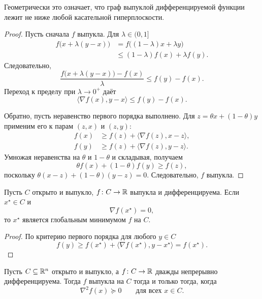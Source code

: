 Геометрически это означает, что граф выпуклой дифференцируемой
функции лежит не ниже любой касательной гиперплоскости.

\begin{proof}
Пусть сначала \(f\) выпукла. Для \(\lambda\in(0,1]\)
\[
\begin{aligned}
    f\bigl(x+\lambda(y-x)\bigr)
    &=
    f\bigl((1-\lambda)x+\lambda y\bigr)
    \\
    &\le
    (1-\lambda)f(x)+\lambda f(y).
\end{aligned}
\]
Следовательно,
\[
    \frac{
        f\bigl(x+\lambda(y-x)\bigr)-f(x)
    }{\lambda}
    \le
    f(y)-f(x).
\]
Переход к пределу при \(\lambda\to0^+\) даёт
\[
    \langle\nabla f(x),y-x\rangle
    \le
    f(y)-f(x).
\]

Обратно, пусть неравенство первого порядка выполнено. Для
\(z=\theta x+(1-\theta)y\) применим его к парам \((z,x)\) и
\((z,y)\):
\[
\begin{aligned}
    f(x)&\ge f(z)+\langle\nabla f(z),x-z\rangle,\\
    f(y)&\ge f(z)+\langle\nabla f(z),y-z\rangle.
\end{aligned}
\]
Умножая неравенства на \(\theta\) и \(1-\theta\) и складывая,
получаем
\[
    \theta f(x)+(1-\theta)f(y)\ge f(z),
\]
поскольку
\(\theta(x-z)+(1-\theta)(y-z)=0\). Следовательно, \(f\) выпукла.
\end{proof}

\begin{corollary}
Пусть \(C\) открыто и выпукло, \(f\colon C\to\mathbb{R}\) выпукла и
дифференцируема. Если \(x^\star\in C\) и
\[
    \nabla f(x^\star)=0,
\]
то \(x^\star\) является глобальным минимумом \(f\) на \(C\).
\end{corollary}

\begin{proof}
По критерию первого порядка для любого \(y\in C\)
\[
    f(y)
    \ge
    f(x^\star)
    +
    \langle\nabla f(x^\star),y-x^\star\rangle
    =
    f(x^\star).
\]
\end{proof}



\begin{theorem}
Пусть \(C\subseteq\mathbb{R}^n\) открыто и выпукло, а
\(f\colon C\to\mathbb{R}\) дважды непрерывно дифференцируема. Тогда \(f\)
выпукла на \(C\) тогда и только тогда, когда
\[
    \nabla^2f(x)\succeq0
    \qquad
    \text{для всех }x\in C.
\]
\end{theorem}

